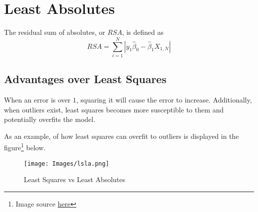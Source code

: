 \section{Least Absolutes}
The residual sum of absolutes, or $RSA$, is defined as
\[
RSA=\sum_{i=1}^{N}\left|y_1\hat{\beta}_0-\hat{\beta}_1X_{1,N}\right|
\]

\subsection{Advantages over Least Squares}
When an error is over $1$, squaring it will cause the error to increase. Additionally, when outliers exist, least squares becomes more susceptible to them and potentially overfits the model.

As an example, of how least squares can overfit to outliers is displayed in the figure\footnote{Image source \href{https://demonstrations.wolfram.com/ComparingLeastSquaresFitAndLeastAbsoluteDeviationsFit/}{here}} below.
\begin{figure}[!ht]
    \centering
    \texttt{[image: Images/lsla.png]}
    \caption{Least Squares vs Least Absolutes}
\end{figure}

